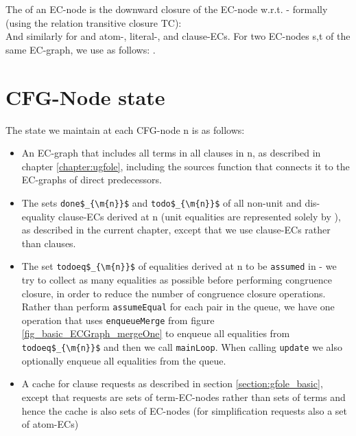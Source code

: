 The  of an EC-node is the downward closure of the EC-node w.r.t. \GFAs{} - formally (using the relation transitive closure TC):\\
And similarly for \GFAs{} and atom-, literal-, and clause-ECs.
For two EC-nodes s,t of the same EC-graph, we use  as follows:
.

\bigskip 

\section*{CFG-Node state}
The state we maintain at each CFG-node n is as follows:
\begin{itemize}
	\item An EC-graph  that includes all terms in all clauses in n, as described in chapter \ref{chapter:ugfole}, including the sources function that connects it to the EC-graphs of direct predecessors.
	\item The sets \lstinline|done$_{\m{n}}$| and \lstinline|todo$_{\m{n}}$| of all non-unit and dis-equality clause-ECs derived at n (unit equalities are represented solely by ), as described in the current chapter, except that we use clause-ECs rather than clauses.
	\item The set \lstinline|todoeq$_{\m{n}}$| of equalities derived at n to be \lstinline|assumed| in  - we try to collect as many equalities as possible before performing congruence closure, in order to reduce the number of congruence closure operations. 
	Rather than perform \lstinline|assumeEqual| for each pair in the queue, we have one operation that uses \lstinline|enqueueMerge| from figure \ref{fig_basic_ECGraph_mergeOne} to enqueue all equalities from \lstinline|todoeq$_{\m{n}}$| and then we call \lstinline|mainLoop|.
	When calling \lstinline|update| we also optionally enqueue all equalities from the queue.
	\item A cache for clause requests as described in section \ref{section:gfole_basic}, except that requests are sets of term-EC-nodes rather than sets of terms and hence the cache is also sets of EC-nodes (for simplification requests also a set of atom-ECs)
\end{itemize}

